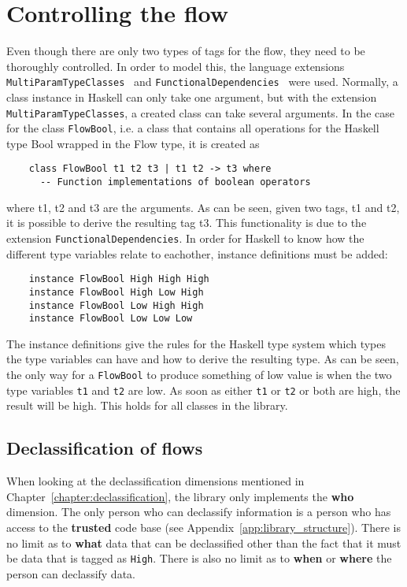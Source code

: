 \section{Controlling the flow}
Even though there are only two types of tags for the flow, they need to be thoroughly controlled. In order to model this, the language extensions {\tt MultiParamTypeClasses}~\cite{haskell-multiparamtypeclasses} and {\tt FunctionalDependencies}~\cite{haskell-functionaldependencies} were used. Normally, a class instance in Haskell can only take one argument, but with the extension {\tt MultiParamTypeClasses}, a created class can take several arguments. In the case for the class {\tt FlowBool}, i.e. a class that contains all operations for the Haskell type Bool wrapped in the Flow type, it is created as
\begin{verbatim}
    class FlowBool t1 t2 t3 | t1 t2 -> t3 where
      -- Function implementations of boolean operators
\end{verbatim}
where t1, t2 and t3 are the arguments. As can be seen, given two tags, t1 and t2, it is possible to derive the resulting tag t3. This functionality is due to the extension {\tt FunctionalDependencies}. In order for Haskell to know how the different type variables relate to eachother, instance definitions must be added:
\begin{verbatim}
    instance FlowBool High High High
    instance FlowBool High Low High
    instance FlowBool Low High High
    instance FlowBool Low Low Low
\end{verbatim}
The instance definitions give the rules for the Haskell type system which types the type variables can have and how to derive the resulting type. As can be seen, the only way for a {\tt FlowBool} to produce something of low value is when the two type variables {\tt t1} and {\tt t2} are low. As soon as either {\tt t1} or {\tt t2} or both are high, the result will be high. This holds for all classes in the library.

\subsection{Declassification of flows}
When looking at the declassification dimensions mentioned in Chapter~\ref{chapter:declassification}, the library only implements the \textbf{who} dimension. The only person who can declassify information is a person who has access to the \textbf{trusted} code base (see Appendix~\ref{app:library_structure}). There is no limit as to \textbf{what} data that can be declassified other than the fact that it must be data that is tagged as {\tt High}. There is also no limit as to \textbf{when} or \textbf{where} the person can declassify data.

